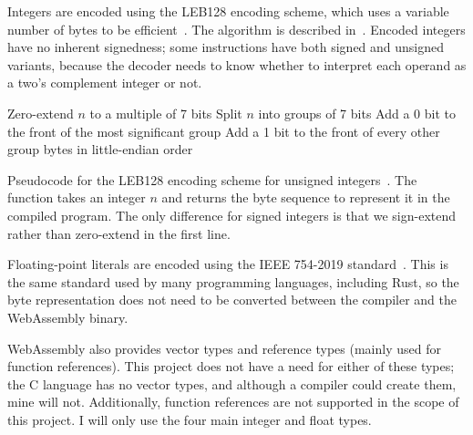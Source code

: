 \documentclass[00-main.tex]{subfiles}
\begin{document}
Integers are encoded using the LEB128 encoding scheme, which uses a variable number of bytes to be efficient~.
The algorithm is described in~.
Encoded integers have no inherent signedness; some instructions have both signed and unsigned variants, because the decoder needs to know whether to interpret each operand as a two's complement integer or not.


\begin{listing}[t]
  \begin{PseudocodeListing}
      \State Zero-extend $n$ to a multiple of 7 bits
      \State Split $n$ into groups of 7 bits
      \State Add a 0 bit to the front of the most significant group
      \State Add a 1 bit to the front of every other group
      \State \Return bytes in little-endian order
    \EndFunction
  \end{PseudocodeListing}
  \caption{Pseudocode for the LEB128 encoding scheme for unsigned integers~. The function takes an integer $n$ and returns the byte sequence to represent it in the compiled program. The only difference for signed integers is that we sign-extend rather than zero-extend in the first line.}
  \label{lst:leb128 pseudocode}
\end{listing}

Floating-point literals are encoded using the IEEE 754-2019 standard~. %
This is the same standard used by many programming languages, including Rust, so the byte representation does not need to be converted between the compiler and the WebAssembly binary.

WebAssembly also provides vector types and reference types (mainly used for function references).
This project does not have a need for either of these types; the C language has no vector types, and although a compiler could create them, mine will not.
Additionally, function references are not supported in the scope of this project.
I will only use the four main integer and float types.
\end{document}
